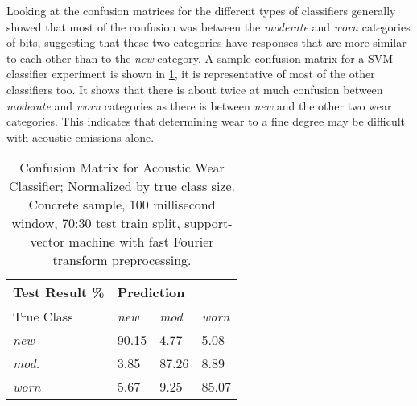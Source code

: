 Looking at the confusion matrices for the different types of classifiers generally showed
that most of the confusion was between the \textit{moderate} and \textit{worn} categories of bits, suggesting that
these two categories have responses that are more similar to each other than to the \textit{new} category.
A sample confusion matrix for a SVM classifier experiment is shown in \ref{tab:conf}, 
it is representative of most of the other classifiers too. 
It shows that there is about twice at much confusion between \textit{moderate} and \textit{worn} categories as there is 
between \textit{new} and the other two wear categories.
This indicates that determining wear to a fine degree may be difficult with acoustic emissions alone.

\begin{table}[h]
\centering
\caption{Confusion Matrix for Acoustic Wear Classifier; Normalized by true class size. \newline
         Concrete sample, 100 millisecond window, 70:30 test train split, \newline
         support-vector machine with fast Fourier transform preprocessing.}
\label{tab:conf}
\begin{tabular}{|l|lll|}
\hline
Test Result \% & \multicolumn{3}{l|}{Prediction}                            \\ \hline
True Class    & \multicolumn{1}{l|}{\textit{new}} & \multicolumn{1}{l|}{\textit{mod}} & \textit{worn} \\ \hline
\textit{new}           & \multicolumn{1}{l|}{90.15 }    & \multicolumn{1}{l|}{ 4.77}    &  5.08    \\ \hline
\textit{mod.}           & \multicolumn{1}{l|}{3.85}    & \multicolumn{1}{l|}{87.26}    &   8.89    \\ \hline
\textit{worn}          & \multicolumn{1}{l|}{5.67}    & \multicolumn{1}{l|}{9.25}    &  85.07     \\ \hline
\end{tabular}
\end{table}


